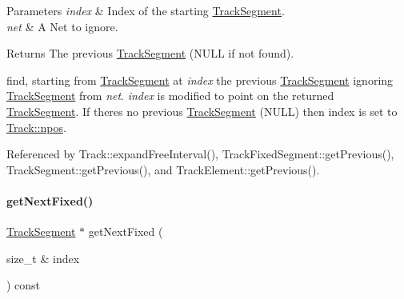 \begin{DoxyParams}{Parameters}
{\em index} & Index of the starting \mbox{\hyperlink{classKite_1_1TrackSegment}{Track\+Segment}}. \\
\hline
{\em net} & A {\ttfamily Net} to ignore. \\
\hline
\end{DoxyParams}
\begin{DoxyReturn}{Returns}
The previous \mbox{\hyperlink{classKite_1_1TrackSegment}{Track\+Segment}} ({\ttfamily N\+U\+LL} if not found).
\end{DoxyReturn}
find, starting from \mbox{\hyperlink{classKite_1_1TrackSegment}{Track\+Segment}} at {\itshape index} the previous \mbox{\hyperlink{classKite_1_1TrackSegment}{Track\+Segment}} ignoring \mbox{\hyperlink{classKite_1_1TrackSegment}{Track\+Segment}} from {\itshape net}. {\itshape index} is modified to point on the returned \mbox{\hyperlink{classKite_1_1TrackSegment}{Track\+Segment}}. If there\textquotesingle{}s no previous \mbox{\hyperlink{classKite_1_1TrackSegment}{Track\+Segment}} ({\ttfamily N\+U\+LL}) then index is set to \mbox{\hyperlink{classKite_1_1Track_ae0070ea45b2592ce3701ab9e486e58a0}{Track\+::npos}}. 

Referenced by Track\+::expand\+Free\+Interval(), Track\+Fixed\+Segment\+::get\+Previous(), Track\+Segment\+::get\+Previous(), and Track\+Element\+::get\+Previous().

\mbox{\label{classKite_1_1Track_a72e18efeecb4641a1ad2989d80b48fec}} 
\paragraph{\texorpdfstring{get\+Next\+Fixed()}{getNextFixed()}}
{\footnotesize\ttfamily \mbox{\hyperlink{classKite_1_1TrackSegment}{Track\+Segment}} $\ast$ get\+Next\+Fixed (\begin{DoxyParamCaption}\item[{size\+\_\+t \&}]{index }\end{DoxyParamCaption}) const}


